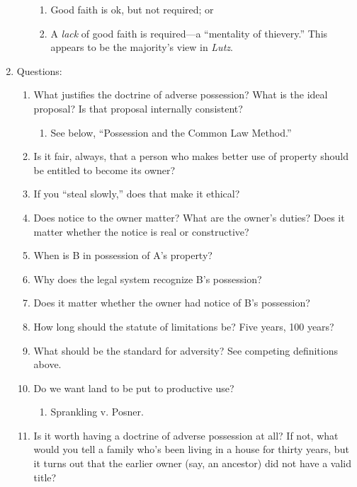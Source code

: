 \begin{enumerate}
\begin{enumerate}
\begin{enumerate}
            \item Good faith is ok, but not required; or
            \item A \emph{lack} of good faith is required---a ``mentality of 
            thievery.'' This appears to be the majority's view in \emph{Lutz}.
        \end{enumerate}
    \end{enumerate}
    \item Questions:
    \begin{enumerate}
        \item What justifies the doctrine of adverse possession? What is the 
        ideal proposal? Is that proposal internally consistent?
        \begin{enumerate}
            \item See below, ``Possession and the Common Law Method.''
        \end{enumerate}
        \item Is it fair, always, that a person who makes better use of property 
        should be entitled to become its owner?
        \item If you ``steal slowly,'' does that make it ethical?
        \item Does notice to the owner matter? What are the owner's duties? 
        Does it matter whether the notice is real or constructive?
        \item When is B in possession of A's property?
        \item Why does the legal system recognize B's possession?
        \item Does it matter whether the owner had notice of B's possession?
        \item How long should the statute of limitations be? Five years, 100 
        years?
        \item What should be the standard for adversity? See competing 
        definitions above.
        \item Do we want land to be put to productive use?
        \begin{enumerate}
            \item Sprankling v. Posner.
        \end{enumerate}
        \item Is it worth having a doctrine of adverse possession at all? If 
        not, what would you tell a family who's been living in a house for 
        thirty years, but it turns out that the earlier owner (say, an 
        ancestor) did not have a valid title?

\end{enumerate}
\end{enumerate}
